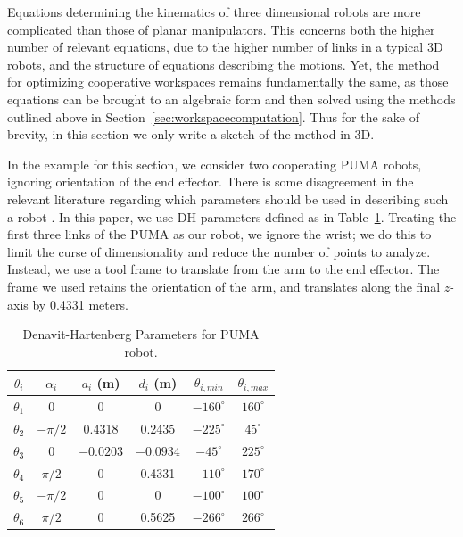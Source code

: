 \documentclass[12pt]{report}
\begin{document}
Equations determining the kinematics of three dimensional robots are more complicated than those of planar manipulators. This concerns both the higher number of relevant equations, due to the higher number of links in a typical 3D robots, and the structure of equations describing the motions. Yet, the method for optimizing cooperative workspaces remains fundamentally the same, as those equations can be brought to an algebraic form and then solved using the methods outlined above in Section~\ref{sec:workspacecomputation}. Thus for the sake of brevity, in this section we only write a sketch of the method in 3D. 

In the example for this section, we consider two cooperating PUMA robots, ignoring orientation of the end effector.   There is some disagreement in the relevant literature regarding which parameters should be used in describing such a robot \cite{consensus} . In this paper, we use DH parameters defined as in Table~\ref{tab:pumadh}. Treating the first three links of the PUMA as our robot, we ignore the wrist; we do this to limit the curse of dimensionality and reduce the number of points to analyze.  Instead, we use a tool frame to translate from the arm to the end effector.  The frame we used retains the orientation of the arm, and translates along the final $z$-axis by 0.4331 meters.


\vskip0.3cm
\begin{table}
\begin{center}
\caption{Denavit-Hartenberg Parameters for PUMA robot.}
\label{tab:pumadh}
\begin{tabular}{| c | c | c | c | c | c |}
\hline
$\theta_i$			&	$\alpha_i$			&	$a_i$ (m)	&	$d_i$ (m)		&  $\theta_{i,min}$	&	$\theta_{i,max}$\\ \hline
$\theta_1$ 		&	0					& 	0		&	0			& $-160^\circ$	& $160^\circ$ \\
$\theta_2$ 		&	$-\pi/2$				& 	0.4318		&	0.2435		&$-225^\circ$	& $45^\circ$	\\
$\theta_3$		&	0					&	$-0.0203$		&	$-0.0934$		&$-45^\circ$	& $225^\circ$	\\
$\theta_4$		&	$\pi/2$				&	0		&	0.4331		&$-110^\circ$	& $170^\circ$	\\
$\theta_5$		&	$-\pi/2$				&	0		&	0			&$-100^\circ$	& $100^\circ$	\\
$\theta_6$		&	$\pi/2$				&	0		& 	0.5625			&$-266^\circ$	& $266^\circ$	 \\ 
\hline
\end{tabular}
\end{center}
\end{table}
\end{document}
